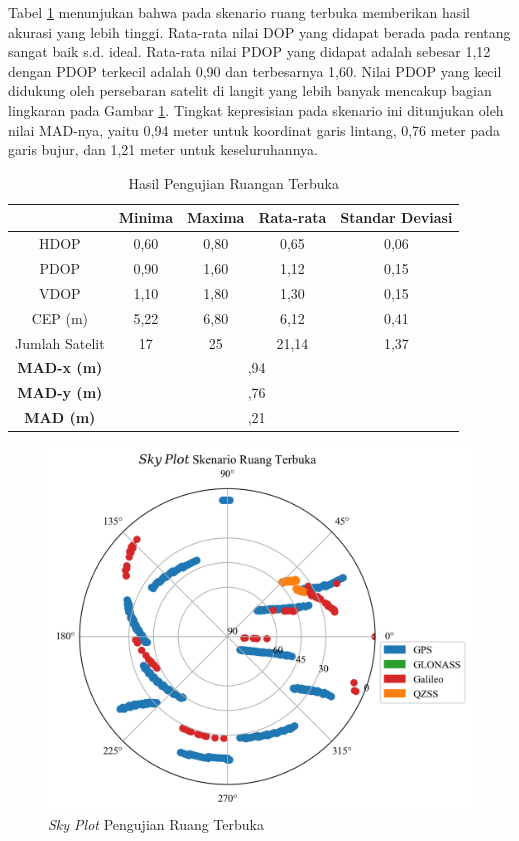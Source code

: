 Tabel \ref{Tab: outdoor-table} menunjukan bahwa pada skenario ruang terbuka memberikan hasil akurasi yang lebih tinggi. Rata-rata nilai DOP yang didapat berada pada rentang sangat baik s.d. ideal. Rata-rata nilai PDOP yang didapat adalah sebesar 1,12 dengan PDOP terkecil adalah 0,90 dan terbesarnya 1,60. Nilai PDOP yang kecil didukung oleh persebaran satelit di langit yang lebih banyak mencakup bagian lingkaran pada Gambar \ref{Fig: outdoor-skyplot}. Tingkat kepresisian pada skenario ini ditunjukan oleh nilai MAD-nya, yaitu 0,94 meter untuk koordinat garis lintang, 0,76 meter pada garis bujur, dan 1,21 meter untuk keseluruhannya.

\begin{table}[H]
	\caption{Hasil Pengujian Ruangan Terbuka}
	\vspace{0.5em}
	\centering
	\begin{tabular}{ccccc}
		\hline
		& \textbf{Minima} & \textbf{Maxima} & \textbf{Rata-rata} & \textbf{Standar Deviasi}\\
		\hline 
		HDOP & 0,60 & 0,80 & 0,65 & 0,06 \\
		PDOP & 0,90 & 1,60 & 1,12 & 0,15 \\
		VDOP & 1,10	& 1,80 & 1,30 & 0,15 \\
		CEP (m) & 5,22 & 6,80 & 6,12 & 0,41 \\
		Jumlah Satelit & 17	& 25 & 21,14 & 1,37 \\
		\hline
		\textbf{MAD-x (m)} & & \multicolumn{2}{c}{\centering 0,94} & \\
		\hline
		\textbf{MAD-y (m)} & & \multicolumn{2}{c}{\centering 0,76} & \\
		\hline
		\textbf{MAD (m)} & & \multicolumn{2}{c}{\centering 1,21} & \\
		\hline
	\end{tabular}
	\label{Tab: outdoor-table}
\end{table}

\begin{figure}[H]
	\centering
	\includegraphics[width=12cm]{contents/chapter-4/4-skenario-outdoor/sky_plot.png}
	\caption{\textit{Sky Plot} Pengujian Ruang Terbuka}
	\label{Fig: outdoor-skyplot}
\end{figure}


